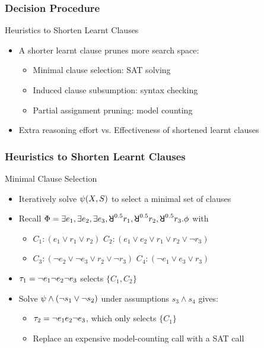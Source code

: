 \begin{frame}
    \frametitle{Decision Procedure}
    \begin{block}{Heuristics to Shorten Learnt Clauses}
        \begin{itemize}
            \item A shorter learnt clause prunes more search space:
                  \pause
                  \begin{itemize}
                      \item Minimal clause selection: SAT solving
                            \pause
                      \item Induced clause subsumption: syntax checking
                            \pause
                      \item Partial assignment pruning: model counting
                            \pause
                  \end{itemize}
            \item Extra reasoning effort vs. Effectiveness of shortened learnt clauses
        \end{itemize}
    \end{block}
\end{frame}

\begin{frame}
    \frametitle{Heuristics to Shorten Learnt Clauses}
    \begin{block}{Minimal Clause Selection}
        \begin{itemize}
            \item Iteratively solve $\psi(X,S)$ to select a minimal set of clauses
                  \pause
            \item Recall $\Qf=\exists e_1,\exists e_2,\exists e_3,\random{0.5} r_1,\random{0.5} r_2,\random{0.5} r_3.\pf$ with
                  \begin{itemize}
                      \item[] $C_1: (e_1 \lor r_1 \lor r_2)$ $C_2: (e_1 \lor e_2 \lor r_1 \lor r_2 \lor \lnot r_3)$
                      \item[] $C_3: (\lnot e_2 \lor \lnot e_3 \lor r_2 \lor \lnot r_3)$ $C_4: (\lnot e_1 \lor e_3 \lor r_3)$
                  \end{itemize}
                  \pause
            \item $\tau_1=\lnot e_1 \lnot e_2 \lnot e_3$ selects $\{C_1,C_2\}$
                  \pause
            \item Solve $\psi\land(\lnot s_1\lor\lnot s_2)$ under assumptions $s_3\land s_4$ gives:
                  \pause
                  \begin{itemize}
                      \item $\tau_2=\lnot e_1 e_2 \lnot e_3$, which only selects $\{C_1\}$
                            \pause
                      \item Replace an expensive model-counting call with a SAT call
                  \end{itemize}
        \end{itemize}
    \end{block}
\end{frame}

